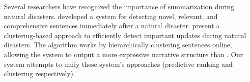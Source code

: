 Several researchers have recognized the importance of summarization during
natural disasters.  \cite{qi:temporal-summarization} developed a system for 
detecting novel, relevant, and comprehensive sentences immediately after a 
natural disaster.  \cite{wang:update-summarization} present a clustering-based
approach to efficiently detect important updates during natural disasters.  
The algorithm works by hierarchically clustering sentences online, allowing 
the system to output a more expressive narrative structure than 
\cite{qi:temporal-summarization}.  Our system attempts to unify these system's
approaches (predictive ranking and clustering respectively). 
